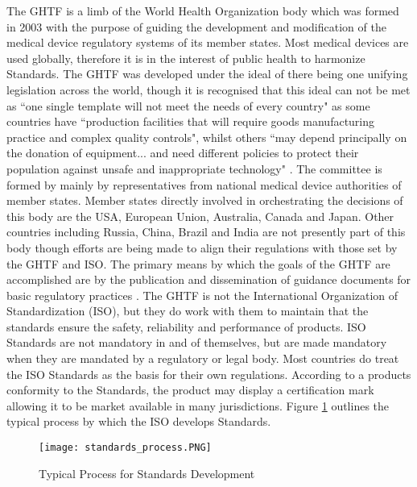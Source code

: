 \documentclass[12pt, openany, oneside]{book}
\begin{document}
The GHTF is a limb of the World Health Organization body which was formed in 2003 with the purpose of guiding the development and modification of the medical device regulatory systems of its member states. Most medical devices are used globally, therefore it is in the interest of public health to harmonize Standards. The GHTF was developed under the ideal of there being one unifying legislation across the world, though it is recognised that this ideal can not be met as ``one single template will not meet the needs of every country" as some countries have ``production facilities that will require goods manufacturing practice and complex quality controls", whilst others ``may depend principally on the donation of equipment... and need different policies to protect their population against unsafe and inappropriate technology" \citep{cheng2003}. The committee is formed by mainly by representatives from national medical device authorities  of member states. Member states directly involved in orchestrating the decisions of this body are the USA, European Union, Australia, Canada and Japan. Other countries including Russia, China, Brazil and India are not presently part of this body though efforts are being made to align their regulations with those set by the GHTF and ISO. The primary means by which the goals of the GHTF are accomplished are by the publication and dissemination of guidance documents for basic regulatory practices \citep{cheng2003}. The GHTF is not the International Organization of Standardization (ISO), but they do work with them to maintain that the standards ensure the safety, reliability and performance of products. ISO Standards are not mandatory in and of themselves, but are made mandatory when they are mandated by a regulatory or legal body. Most countries do treat the ISO Standards as the basis for their own regulations. According to a products conformity to the Standards, the product may display a certification mark allowing it to be market available in many jurisdictions. Figure \ref{fig:standards} outlines the typical process by which the ISO develops Standards. \\

\begin{figure}	
		\centering
		\texttt{[image: standards\_process.PNG]}
		\caption[Process of designing Regulatory Standards]{Typical Process for Standards Development \citep{cheng2003}} 
		\label{fig:standards}	
	
\end{figure}
\end{document}
